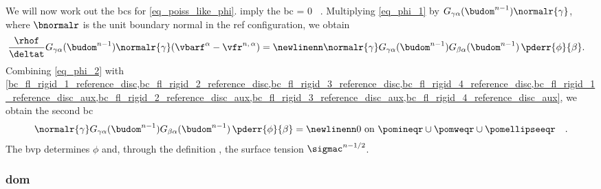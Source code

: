 \begin{enumerate}
{        We will now work out the \acp{bc} for \cref{eq_poiss_like_phi}.  imply the \ac{bc}
        \be
        \label{bc_phi_1}
        \phi = 0 \,  \pomouteqr.
        \ee
        Multiplying \cref{eq_phi_1} by $G_{\gamma \alpha}(\budom^{n-1}) \normalr{\gamma}$, where $\bnormalr$ is the unit boundary normal in the \ac{ref} configuration,  we obtain
        \begin{align}
            \label{eq_phi_2}
            \frac{\rhof}{\deltat} G_{\gamma \alpha}(\budom^{n-1}) \normalr{\gamma} (\vbarf^\alpha - \vfr^{n, \, \alpha}) & = \newlinenn
            \normalr{\gamma} G_{\gamma \alpha}(\budom^{n-1})  G_{\beta \alpha}(\budom^{n-1})  \,          \pderr{ \phi   }{\beta }.
        \end{align}
        Combining \cref{eq_phi_2} with \cref{bc_fl_rigid_1_reference_disc,bc_fl_rigid_2_reference_disc,bc_fl_rigid_3_reference_disc,bc_fl_rigid_4_reference_disc,bc_fl_rigid_1_reference_disc_aux,bc_fl_rigid_2_reference_disc_aux,bc_fl_rigid_3_reference_disc_aux,bc_fl_rigid_4_reference_disc_aux}, we obtain the second \ac{bc}
        \begin{align}
            \label{bc_phi_2}
            \normalr{\gamma}  G_{\gamma \alpha}(\budom^{n-1})  G_{\beta \alpha}(\budom^{n-1}) \,          \pderr{ \phi   }{\beta } & = \newlinenn 0
            \text{ on } \pomineqr \cup \pomweqr \cup \pomellipseeqr                                                                & .
        \end{align}
        The \ac{bvp}  determines $\phi$ and, through the definition , the surface tension $\sigmac^{n-1/2}$.
    }
\end{enumerate}


\subsubsection{\Acl{dom}}


